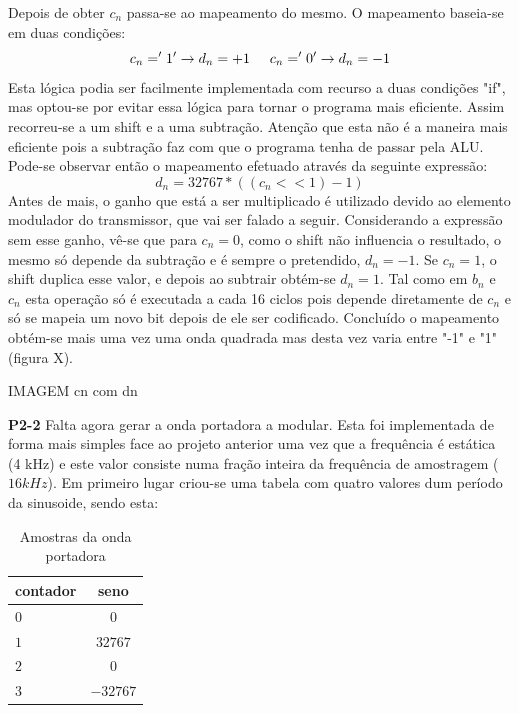 \documentclass[11pt]{article}
\begin{document}
Depois de obter $ c_n $ passa-se ao mapeamento do mesmo. O mapeamento baseia-se em duas condições:
\begin{equation}
	c_n= '1' \rightarrow d_n =+1 \hspace{5 mm} c_n='0' \rightarrow d_n=-1
\end{equation}
Esta lógica podia ser facilmente implementada com recurso a duas condições "if", mas optou-se por evitar essa lógica para tornar o programa mais eficiente.
Assim recorreu-se a um shift e a uma subtração. Atenção que esta não é a maneira mais eficiente pois a subtração faz com que o programa tenha de passar pela ALU.
Pode-se observar então o mapeamento efetuado através da seguinte expressão:
\begin{equation}
d_n=32767*((c_n << 1)-1)
\end{equation}
Antes de mais, o ganho que está a ser multiplicado é utilizado devido ao elemento modulador do transmissor, que vai ser falado a seguir. Considerando a expressão sem esse ganho, vê-se que para $ c_n=0 $, como o shift não influencia o resultado, o mesmo só depende da subtração e é sempre o pretendido, $d_n=-1$. Se $c_n=1$, o shift duplica  esse valor, e depois ao subtrair obtém-se $d_n=1$. \vfill
Tal como em $b_n$ e $c_n$ esta operação só é executada a cada 16 ciclos pois depende diretamente de $c_n$ e só se mapeia um novo bit depois de ele ser codificado. Concluído o mapeamento obtém-se mais uma vez uma onda quadrada mas desta vez varia entre "-1" e "1" (figura X).

IMAGEM cn com dn

\vspace{2 mm}
\textbf{P2-2}
Falta agora gerar a onda portadora a modular. Esta foi implementada de forma mais simples face ao projeto anterior uma vez que a frequência é estática (4 kHz) e este valor consiste numa fração inteira da frequência de amostragem ($16 kHz$).
Em primeiro lugar criou-se uma tabela com quatro valores dum período da sinusoide, sendo esta: %
\begin{table}[H]
	\centering
	\caption{Amostras da onda portadora}
	\label{tab:amostras}
	\begin{tabular}[c]{|l||c|}
		\hline \textbf{contador} & \textbf{seno}\\ 
		\hline $ 0 $ & $ 0 $\\ 
		\hline $ 1 $ & $ 32767 $  \\ 
		\hline $ 2 $ & $ 0 $ \\ 
		\hline $ 3 $ & $ -32767 $ \\
		\hline
	\end{tabular}
\end{table}
\end{document}

